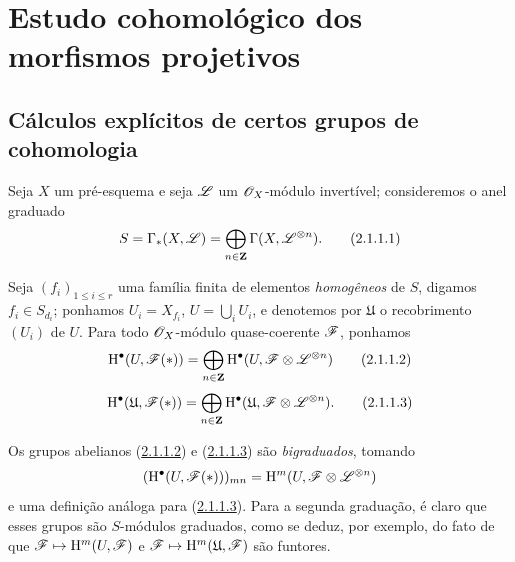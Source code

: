 \section{Estudo cohomológico dos morfismos projetivos}
\label{section:III.2}


\subsection{Cálculos explícitos de certos grupos de cohomologia}
\label{subsection:III.2.1}

\begin{env}[2.1.1]
\label{III.2.1.1}
Seja $X$ um pré-esquema e seja $\mathscr{L}$ um $\mathscr{O}_X$-módulo invertível; consideremos o anel graduado 
\[
\label{III.2.1.1.1}
  S = \Gamma_*(X,\sh{L}) = \bigoplus_{n\in\bb{Z}} \Gamma(X,\sh{L}^{\otimes n}).
  \tag{2.1.1.1}
\]

Seja $(f_i)_{1\leq i\leq r}$ uma família finita de elementos \emph{homogêneos} de $S$, digamos $f_i\in S_{d_i}$; ponhamos $U_i = X_{f_i}$, $U = \bigcup_i U_i$, e denotemos por $\mathfrak{U}$ o recobrimento $(U_i)$ de $U$.
Para todo $\mathscr{O}_X$-módulo quase-coerente $\mathscr{F}$, ponhamos
\[
\label{III.2.1.1.2}
  \HH^\bullet(U,\sh{F}(*)) = \bigoplus_{n\in\bb{Z}} \HH^\bullet(U,\sh{F}\otimes\sh{L}^{\otimes n})
  \tag{2.1.1.2}
\]
\[
\label{III.2.1.1.3}
  \HH^\bullet(\mathfrak{U},\sh{F}(*)) = \bigoplus_{n\in\bb{Z}} \HH^\bullet(\mathfrak{U},\sh{F}\otimes\sh{L}^{\otimes n}).
  \tag{2.1.1.3}
\]

Os grupos abelianos (\hyperref[III.2.1.1.2]{2.1.1.2}) e (\hyperref[III.2.1.1.3]{2.1.1.3}) são \emph{bigraduados}, tomando
\[
  (\mathrm{H}^\bullet(U,\mathscr{F}(*)))_{mn} = \mathrm{H}^m(U,\mathscr{F}\otimes\mathscr{L}^{\otimes n})
\]
e uma definição análoga para (\hyperref[III.2.1.1.3]{2.1.1.3}).
Para a segunda graduação, é claro que esses grupos são $S$-módulos graduados, como se deduz, por exemplo, do fato de que $\sh{F}\mapsto\HH^m(U,\sh{F})$ e $\sh{F}\mapsto\HH^m(\mathfrak{U},\sh{F})$ são funtores.
\end{env}

